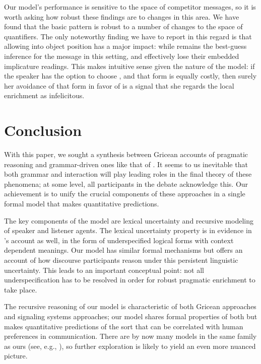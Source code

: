\documentclass[leqno,12pt]{article}
\begin{document}
Our model's performance is sensitive to the space of competitor
messages, so it is worth asking how robust these findings are to
changes in this area. We have found that the basic pattern is robust
to a number of changes to the space of quantifiers.  The only
noteworthy finding we have to report in this regard is that allowing
 into object position has a major impact: while
 remains the best-guess inference for the message
 in this setting,  and
 effectively lose their embedded implicature
readings.  This makes intuitive sense given the nature of the model:
if the speaker has the option to choose , and that form is equally costly, then surely her avoidance
of that form in favor of  is a signal that she
regards the local enrichment as infelicitous.


\section{Conclusion}\label{sec:conclusion}

With this paper, we sought a synthesis between Gricean accounts of
pragmatic reasoning and grammar-driven ones like that of
\citet{ChierchiaFoxSpector08}. It seems to us inevitable that both
grammar and interaction will play leading roles in the final theory of
these phenomena; at some level, all participants in the debate
acknowledge this. Our achievement is to unify the crucial components
of these approaches in a single formal model that makes quantitative
predictions.

The key components of the model are lexical uncertainty and recursive
modeling of speaker and listener agents. The lexical uncertainty
property is in evidence in \citeauthor{ChierchiaFoxSpector08}'s
account as well, in the form of underspecified logical forms with
context dependent meanings. Our model has similar formal mechanisms
but offers an account of how discourse participants reason under this
persistent linguistic uncertainty. This leads to an important
conceptual point: not all underspecification has to be resolved in
order for robust pragmatic enrichment to take place.

The recursive reasoning of our model is characteristic of both Gricean
approaches and signaling systems approaches; our model shares formal
properties of both but makes quantitative predictions of the sort that
can be correlated with human preferences in communication. There are
by now many models in the same family as ours (see, e.g.,
\citealt{CamererHo:2004,Jaeger:2011,Smith:Goodman:Frank:2013,Kao-etal:2014}),
so further exploration is likely to yield an even more nuanced
picture.
\end{document}
